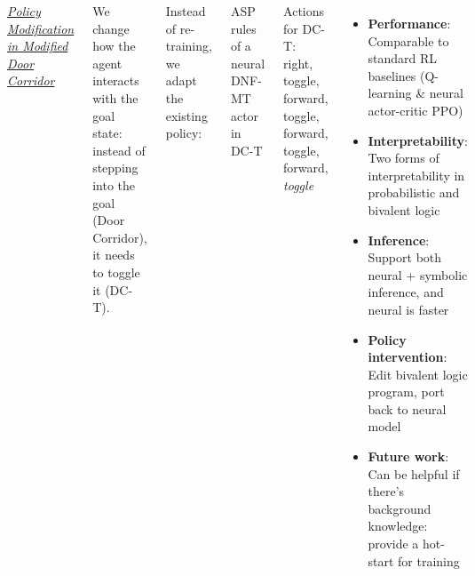 \documentclass{tikzposter} %
\begin{document}
\begin{columns}
{        \underline{\emph{Policy Modification in Modified Door Corridor}}

        \vspace{0.3em}

        We change how the agent interacts with the goal state: instead of
        stepping into the goal (Door Corridor), it needs to toggle it (DC-T).

        Instead of re-training, we adapt the existing policy:

        \begin{center}
            {\small ASP rules of a neural DNF-MT actor in DC-T}
            
        \end{center}

        Actions for DC-T: right, toggle, forward, toggle, forward, toggle,
        forward, \emph{toggle}

    }

     {

        \begin{itemize}
            \item \textbf{Performance}: Comparable to standard RL baselines
                  (Q-learning \& neural actor-critic PPO)

            \item \textbf{Interpretability}: Two forms of interpretability
                  in probabilistic and bivalent logic

            \item \textbf{Inference}: Support both neural + symbolic
                  inference, and neural is faster

            \item \textbf{Policy intervention}: Edit bivalent logic program,
                  port back to neural model

            \item \textbf{Future work}: Can be helpful if there’s background
                  knowledge: provide a hot-start for training

        \end{itemize}

}
\end{columns}
\end{document}
